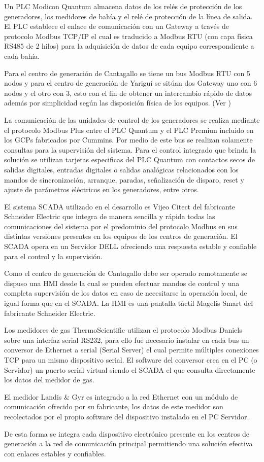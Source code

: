 Un PLC Modicon Quantum almacena datos de los relés de protección de los generadores, los medidores de bahía y el relé de protección de la línea de salida. El PLC establece el enlace de comunicación con un Gateway a través de protocolo Modbus TCP/IP el cual es traducido a Modbus RTU (con capa física RS485 de 2 hilos) para la adquisición de datos de cada equipo correspondiente a cada bahía. 

Para el centro de generación de Cantagallo se tiene un bus Modbus RTU con 5 nodos y para el centro de generación de Yariguí se sitúan dos Gateway uno con 6 nodos y el otro con 3, esto con el fin de obtener un intercambio rápido de datos además por simplicidad según las disposición física de los equipos. (Ver )

La comunicación de las unidades de control de los generadores se realiza mediante el protocolo Modbus Plus entre el PLC Quantum y el PLC Premiun incluido en los GCPs fabricados por Cummins. Por medio de este bus se realizan solamente consultas para la supervisión del sistema. Para el control integrado que brinda la solución se utilizan tarjetas especificas del PLC Quantum con contactos secos de salidas digitales, entradas digitales o salidas analógicas relacionados con los mandos de sincronización, arranque, paradas, señalización de disparo, reset y ajuste de parámetros eléctricos en los generadores, entre otros.

El sistema SCADA utilizado en el desarrollo es Vijeo Citect del fabricante Schneider Electric que integra de manera sencilla y rápida todas las comunicaciones del sistema por el predominio del protocolo Modbus en sus distintas versiones presentes en los equipos de los centros de generación. El SCADA opera en un Servidor DELL ofreciendo una respuesta estable y confiable para el control y la supervisión.

Como el centro de generación de Cantagallo debe ser operado remotamente se dispuso una HMI desde la cual se pueden efectuar mandos de control y una completa supervisión de los datos en caso de necesitarse la operación local, de igual forma que en el SCADA. La HMI es una pantalla táctil Magelis Smart del fabricante Schneider Electric.

Los medidores de gas ThermoScientific utilizan el protocolo Modbus Daniels sobre una interfaz serial RS232, para ello fue necesario instalar en cada bus un conversor de Ethernet a serial (Serial Server) el cual permite múltiples conexiones TCP para un mismo dispositivo serial. El software del conversor crea en el PC (o Servidor) un puerto serial virtual siendo el SCADA el que consulta directamente los datos del medidor de gas.

El medidor Landis \& Gyr es integrado a la red Ethernet con un módulo de comunicación ofrecido por su fabricante, los datos de este medidor son recolectados por el propio software del dispositivo instalado en el PC Servidor.

De esta forma se integra cada dispositivo electrónico presente en los centros de generación a la red de comunicación principal permitiendo una solución efectiva con enlaces estables y confiables.



